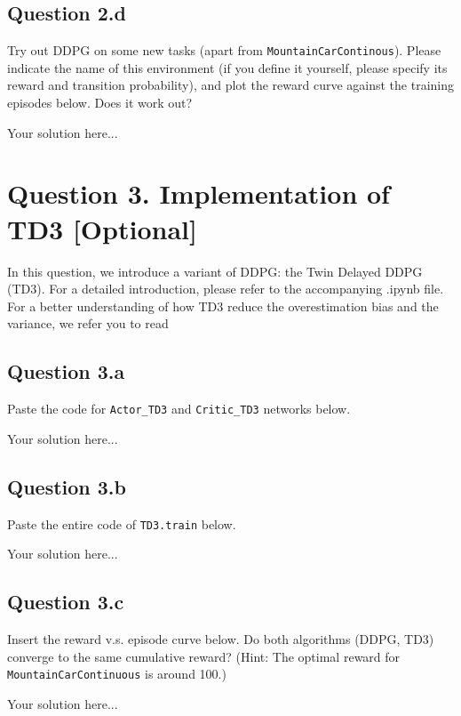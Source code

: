 \documentclass[12pt]{article}
\begin{document}
\subsection*{Question 2.d}
Try out DDPG  on some new tasks (apart from \texttt{MountainCarContinous}). Please indicate the name of this environment (if you define it yourself, please specify its reward and transition probability), and plot the reward curve against the training episodes below. Does it work out?
\begin{solution}
Your solution here...
\end{solution}

\section*{Question 3. Implementation of TD3 [Optional]}
In this question, we introduce a variant of DDPG: the Twin Delayed DDPG (TD3). For a detailed introduction, please refer to the accompanying .ipynb file. For a better understanding of how TD3 reduce the overestimation bias and the variance, we refer you to read \cite[Chapt.~4 and 5]{fujimoto2018addressing}
\subsection*{Question 3.a} 
Paste the code for \texttt{Actor\_TD3} and \texttt{Critic\_TD3} networks below.
\begin{solution}
Your solution here...
\end{solution}
\subsection*{Question 3.b} 
Paste the entire code of \texttt{TD3.train} below.
\begin{solution}
Your solution here...
\end{solution}
\subsection*{Question 3.c} 
Insert the reward v.s. episode curve below. Do both algorithms (DDPG, TD3) converge to the same cumulative reward? (Hint: The optimal reward for \texttt{MountainCarContinuous} is around 100.)
\begin{solution}
Your solution here...
\end{solution}
\printbibliography
\end{document}
